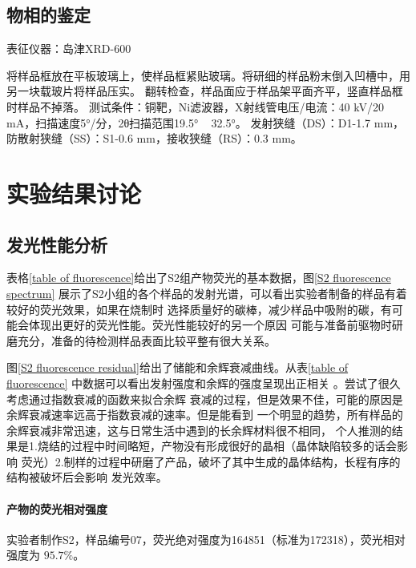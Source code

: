 \documentclass[a4paper,zihao=5,UTF8]{ctexart}
\begin{document}
	\subsection{物相的鉴定}
	表征仪器：岛津XRD-600
	\par
	将样品框放在平板玻璃上，使样品框紧贴玻璃。将研细的样品粉末倒入凹槽中，用另一块载玻片将样品压实。
	翻转检查，样品面应于样品架平面齐平，竖直样品框时样品不掉落。
	测试条件：铜靶，Ni滤波器，X射线管电压/电流：40 kV/20 mA，扫描速度5°/分，2θ扫描范围19.5° ~ 32.5°。
	发射狭缝（DS）：D1-1.7 mm，防散射狭缝（SS）：S1-0.6 mm，接收狭缝（RS）：0.3 mm。
	\section{实验结果讨论}
	\subsection{发光性能分析}
	表格\ref{table of fluorescence}给出了S2组产物荧光的基本数据，图\ref{S2 fluorescence spectrum}
	展示了S2小组的各个样品的发射光谱，可以看出实验者制备的样品有着较好的荧光效果，如果在烧制时
	选择质量好的碳棒，减少样品中吸附的碳，有可能会体现出更好的荧光性能。荧光性能较好的另一个原因
	可能与准备前驱物时研磨充分，准备的待检测样品表面比较平整有很大关系。
	\par 
	图\ref{S2 fluorescence residual}给出了储能和余辉衰减曲线。从表\ref{table of fluorescence}
	中数据可以看出发射强度和余辉的强度呈现出正相关
	。尝试了很久考虑通过指数衰减的函数来拟合余辉
	衰减的过程，但是效果不佳，可能的原因是余辉衰减速率远高于指数衰减的速率。但是能看到
	一个明显的趋势，所有样品的余辉衰减非常迅速，这与日常生活中遇到的长余辉材料很不相同，
	个人推测的结果是1.烧结的过程中时间略短，产物没有形成很好的晶相（晶体缺陷较多的话会影响
	荧光）2.制样的过程中研磨了产品，破坏了其中生成的晶体结构，长程有序的结构被破坏后会影响
	发光效率。
	\paragraph{产物的荧光相对强度}
	实验者制作S2，样品编号07，荧光绝对强度为164851（标准为172318），荧光相对强度为
	$95.7\%$。
\end{document}

